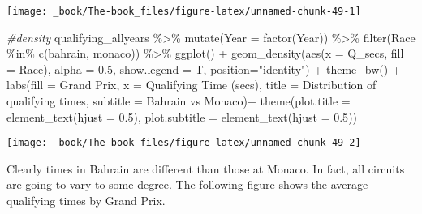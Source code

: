 \documentclass[
]{book}
\newenvironment{Shaded}{\begin{snugshade}}{\end{snugshade}}
\newcommand{\AttributeTok}[1]{\textcolor[rgb]{0.77,0.63,0.00}{#1}}
\newcommand{\CommentTok}[1]{\textcolor[rgb]{0.56,0.35,0.01}{\textit{#1}}}
\newcommand{\FloatTok}[1]{\textcolor[rgb]{0.00,0.00,0.81}{#1}}
\newcommand{\FunctionTok}[1]{\textcolor[rgb]{0.00,0.00,0.00}{#1}}
\newcommand{\NormalTok}[1]{#1}
\newcommand{\SpecialCharTok}[1]{\textcolor[rgb]{0.00,0.00,0.00}{#1}}
\newcommand{\StringTok}[1]{\textcolor[rgb]{0.31,0.60,0.02}{#1}}
\begin{document}
\begin{center}\texttt{[image: \_book/The-book\_files/figure-latex/unnamed-chunk-49-1]} \end{center}

\begin{Shaded}
\begin{Highlighting}[]
\CommentTok{\#density}
\NormalTok{qualifying\_allyears }\SpecialCharTok{\%\textgreater{}\%}
  \FunctionTok{mutate}\NormalTok{(}\AttributeTok{Year =} \FunctionTok{factor}\NormalTok{(Year)) }\SpecialCharTok{\%\textgreater{}\%}
  \FunctionTok{filter}\NormalTok{(Race }\SpecialCharTok{\%in\%} \FunctionTok{c}\NormalTok{(}\StringTok{\textquotesingle{}bahrain\textquotesingle{}}\NormalTok{, }\StringTok{\textquotesingle{}monaco\textquotesingle{}}\NormalTok{)) }\SpecialCharTok{\%\textgreater{}\%}
  \FunctionTok{ggplot}\NormalTok{() }\SpecialCharTok{+}
  \FunctionTok{geom\_density}\NormalTok{(}\FunctionTok{aes}\NormalTok{(}\AttributeTok{x =}\NormalTok{ Q\_secs, }\AttributeTok{fill =}\NormalTok{ Race),}
                 \AttributeTok{alpha =} \FloatTok{0.5}\NormalTok{, }\AttributeTok{show.legend =}\NormalTok{ T,}
                 \AttributeTok{position=}\StringTok{"identity"}\NormalTok{) }\SpecialCharTok{+}
  \FunctionTok{theme\_bw}\NormalTok{() }\SpecialCharTok{+}
  \FunctionTok{labs}\NormalTok{(}\AttributeTok{fill =} \StringTok{\textquotesingle{}Grand Prix\textquotesingle{}}\NormalTok{,}
       \AttributeTok{x =} \StringTok{\textquotesingle{}Qualifying Time (secs)\textquotesingle{}}\NormalTok{,}
       \AttributeTok{title =} \StringTok{\textquotesingle{}Distribution of qualifying times\textquotesingle{}}\NormalTok{,}
       \AttributeTok{subtitle =} \StringTok{\textquotesingle{}Bahrain vs Monaco\textquotesingle{}}\NormalTok{)}\SpecialCharTok{+}
  \FunctionTok{theme}\NormalTok{(}\AttributeTok{plot.title =} \FunctionTok{element\_text}\NormalTok{(}\AttributeTok{hjust =} \FloatTok{0.5}\NormalTok{),}
        \AttributeTok{plot.subtitle =} \FunctionTok{element\_text}\NormalTok{(}\AttributeTok{hjust =} \FloatTok{0.5}\NormalTok{)) }
\end{Highlighting}
\end{Shaded}

\begin{center}\texttt{[image: \_book/The-book\_files/figure-latex/unnamed-chunk-49-2]} \end{center}

Clearly times in Bahrain are different than those at Monaco. In fact, all circuits are going to vary to some degree. The following figure shows the average qualifying times by Grand Prix.
\end{document}
